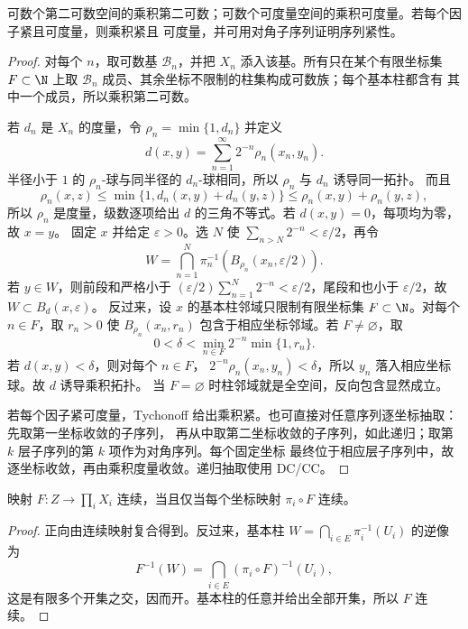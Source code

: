 \begin{proposition}[可数乘积的第二可数性与可度量化]\label{proposition:1-2-2-3}
可数个第二可数空间的乘积第二可数；可数个可度量空间的乘积可度量。若每个因子紧且可度量，则乘积紧且
可度量，并可用对角子序列证明序列紧性。
\end{proposition}
\begin{proof}
对每个 \(n\)，取可数基 \(\mathcal B_n\)，并把 \(X_n\) 添入该基。所有只在某个有限坐标集
\(F\subset\N\) 上取 \(\mathcal B_n\) 成员、其余坐标不限制的柱集构成可数族；每个基本柱都含有
其中一个成员，所以乘积第二可数。

若 \(d_n\) 是 \(X_n\) 的度量，令 \(\rho_n=\min\{1,d_n\}\) 并定义
\[
 d(x,y)=\sum_{n=1}^{\infty}2^{-n}\rho_n(x_n,y_n).
\]
半径小于 \(1\) 的 \(\rho_n\)-球与同半径的 \(d_n\)-球相同，所以 \(\rho_n\) 与 \(d_n\) 诱导同一拓扑。
而且
\[
 \rho_n(x,z)\le \min\{1,d_n(x,y)+d_n(y,z)\}
 \le \rho_n(x,y)+\rho_n(y,z),
\]
所以 \(\rho_n\) 是度量，级数逐项给出 \(d\) 的三角不等式。若 \(d(x,y)=0\)，每项均为零，故 \(x=y\)。
固定 \(x\) 并给定 \(\varepsilon>0\)。选 \(N\) 使
\(\sum_{n>N}2^{-n}<\varepsilon/2\)，再令
\[
 W=\bigcap_{n=1}^N
   \pi_n^{-1}\!\left(B_{\rho_n}(x_n,\varepsilon/2)\right).
\]
若 \(y\in W\)，则前段和严格小于
\((\varepsilon/2)\sum_{n=1}^N2^{-n}<\varepsilon/2\)，尾段和也小于
\(\varepsilon/2\)，故 \(W\subset B_d(x,\varepsilon)\)。
反过来，设 \(x\) 的基本柱邻域只限制有限坐标集 \(F\subset\N\)。对每个 \(n\in F\)，取
\(r_n>0\) 使 \(B_{\rho_n}(x_n,r_n)\) 包含于相应坐标邻域。若 \(F\ne\varnothing\)，取
\[
 0<\delta<\min_{n\in F}2^{-n}\min\{1,r_n\}.
\]
若 \(d(x,y)<\delta\)，则对每个 \(n\in F\)，
\(2^{-n}\rho_n(x_n,y_n)<\delta\)，所以 \(y_n\) 落入相应坐标球。故 \(d\) 诱导乘积拓扑。
当 \(F=\varnothing\) 时柱邻域就是全空间，反向包含显然成立。

若每个因子紧可度量，Tychonoff 给出乘积紧。也可直接对任意序列逐坐标抽取：先取第一坐标收敛的子序列，
再从中取第二坐标收敛的子序列，如此递归；取第 \(k\) 层子序列的第 \(k\) 项作为对角序列。每个固定坐标
最终位于相应层子序列中，故逐坐标收敛，再由乘积度量收敛。递归抽取使用 \textsf{DC}/\textsf{CC}。
\end{proof}

\begin{proposition}[映入乘积的连续性]\label{proposition:1-2-2-4}
映射 \(F:Z\to\prod_iX_i\) 连续，当且仅当每个坐标映射 \(\pi_i\circ F\) 连续。
\end{proposition}
\begin{proof}
正向由连续映射复合得到。反过来，基本柱
\(W=\bigcap_{i\in E}\pi_i^{-1}(U_i)\) 的逆像为
\[
 F^{-1}(W)=\bigcap_{i\in E}(\pi_i\circ F)^{-1}(U_i),
\]
这是有限多个开集之交，因而开。基本柱的任意并给出全部开集，所以 \(F\) 连续。
\end{proof}

